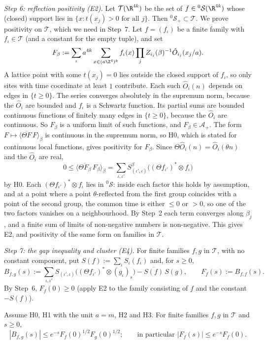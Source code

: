 \emph{Step 6: reflection positivity (E2).} Let $\mathcal T(\R^{4k})$ be the set of $f\in{}^0\mathcal S(\R^{4k})$ whose (closed) support lies in $\{x: t(x_j)>0\text{ for all }j\}$. Then ${}^0\mathcal S_+\subset\mathcal T$. We prove positivity on $\mathcal T$, which we need in Step~7. Let $f=(f_\iota)$ be a finite family with $f_\iota\in\mathcal T$ (and a constant for the empty tuple), and set
\[
  F_\beta:=\sum_\iota a^{4k}\sum_{x\in(a\Z^4)^k}f_\iota(x)\prod_{j}Z_{i_j}(\beta)^{-1}\hat O_{i_j}(x_j/a).
\]
A lattice point with some $t(x_j)=0$ lies outside the closed support of $f_\iota$, so only sites with time coordinate at least $1$ contribute. Each such $\hat O_i(n)$ depends on edges in $\{t\ge0\}$. The series converges absolutely in the supremum norm, because the $\hat O_i$ are bounded and $f_\iota$ is a Schwartz function. Its partial sums are bounded continuous functions of finitely many edges in $\{t\ge0\}$, because the $\hat O_i$ are continuous. So $F_\beta$ is a uniform limit of such functions, and $F_\beta\in\mathcal A_+$. The form $F\mapsto\langle\overline{\Theta F}\,F\rangle_\beta$ is continuous in the supremum norm, so H0, which is stated for continuous local functions, gives positivity for $F_\beta$. Since $\Theta\hat O_i(n)=\hat O_i(\theta n)$ and the $\hat O_i$ are real,
\[
  0\le\langle\overline{\Theta F_\beta}\,F_\beta\rangle_\beta=\sum_{\iota,\iota'}S^\beta_{(\iota',\iota)}\bigl((\Theta f_{\iota'})^*\otimes f_\iota\bigr)
\]
by H0. Each $(\Theta f_{\iota'})^*\otimes f_\iota$ lies in ${}^0\mathcal S$: inside each factor this holds by assumption, and at a point where a point $\theta$-reflected from the first group coincides with a point of the second group, the common time is either $\le0$ or $>0$, so one of the two factors vanishes on a neighbourhood. By Step~2 each term converges along $\beta_j$, and a finite sum of limits of non-negative numbers is non-negative. This gives E2, and positivity of the same form on families in $\mathcal T$.

\emph{Step 7: the gap inequality and cluster (E4).} For finite families $f,g$ in $\mathcal T$, with no constant component, put $S(f):=\sum_\iota S_\iota(f_\iota)$ and, for $s\ge0$,
\[
  B_{f,g}(s):=\sum_{\iota,\iota'}S_{(\iota',\iota)}\bigl((\Theta f_{\iota'})^*\otimes(g_\iota)_s\bigr)-\overline{S(f)}\,S(g),\qquad F_f(s):=B_{f,f}(s).
\]
By Step~6, $F_f(0)\ge0$ (apply E2 to the family consisting of $f$ and the constant $-S(f)$).

\begin{lemma}\label{red:gap}
Assume H0, H1 with the unit $a=m$, H2 and H3. For finite families $f,g$ in $\mathcal T$ and $s\ge0$,
\[
  |B_{f,g}(s)|\le e^{-s}F_f(0)^{1/2}F_g(0)^{1/2};\qquad\text{in particular }|F_f(s)|\le e^{-s}F_f(0).
\]
\end{lemma}

